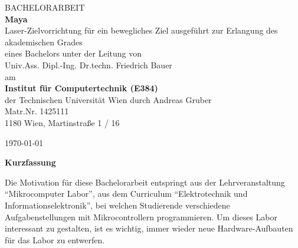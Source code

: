 

\pagestyle{empty}


\begin{titlepage}
\large
\begin{center}
BACHELORARBEIT\\\vfill
{\LARGE\bf Maya}\\
[5mm]
Laser-Zielvorrichtung für ein bewegliches Ziel
\vfill
ausgeführt zur Erlangung des akademischen Grades\\
eines Bachelors unter der Leitung von\\
\vfill
Univ.Ass. Dipl.-Ing. Dr.techn. Friedrich Bauer\\\vfill
am\\\vfill
{\Large\bf Institut für Computertechnik (E384)}\\
der Technischen Universität Wien
\vfill
durch
\vfill
Andreas Gruber\\
Matr.Nr. 1425111\\
1180 Wien, Martinstraße 1 / 16\\\vfill
\end{center}
\today \hfill\hrulefill
\end{titlepage}

\newpage
\pagestyle{plain}
\begin{center}\bf Kurzfassung\end{center}


Die Motivation für diese Bachelorarbeit entspringt aus der Lehrveranstaltung "`Mikrocomputer Labor"', aus dem Curriculum "`Elektrotechnik und Informationselektronik"', bei welchen Studierende verschiedene Aufgabenstellungen mit Mikrocontrollern programmieren. Um dieses Labor interessant zu gestalten, ist es wichtig, immer wieder neue Hardware-Aufbauten für das Labor zu entwerfen.

